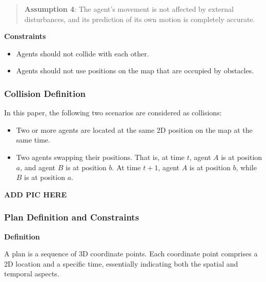 \begin{quotation}
    \textbf{Assumption 4}: 
    The agent's movement is not affected by external disturbances, and its prediction of its own motion is completely accurate.
\end{quotation}

\textbf{Constraints}

\begin{itemize}
    \item Agents should not collide with each other.
    \item Agents should not use positions on the map that are occupied by obstacles.
\end{itemize}

\subsubsection{Collision Definition}

In this paper, the following two scenarios are considered as collisions:
\begin{itemize}
    \item Two or more agents are located at the same 2D position on the map at the same time.
    \item Two agents swapping their positions. That is, at time $t$, agent $A$ is at position $a$, and agent $B$ is at position $b$. At time $t+1$, agent $A$ is at position $b$, while $B$ is at position $a$.
\end{itemize}

\textbf{ADD PIC HERE} %

\subsubsection{Plan Definition and Constraints}

\textbf{Definition}

A plan is a sequence of 3D coordinate points. Each coordinate point comprises a 2D location and a specific time, essentially indicating both the spatial and temporal aspects.


